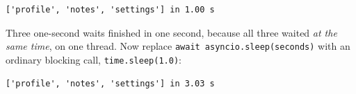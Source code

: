 \begin{codebox}[short]

\begin{Shaded}
\begin{Highlighting}[]


 \NormalTok{) }\OperatorTok{{-}\textgreater{}} \NormalTok{:}


 \OperatorTok{{-}\textgreater{}} \NormalTok{:}
\OperatorTok{=}
\OperatorTok{=} 
\NormalTok{, }\NormalTok{, }\NormalTok{, }\NormalTok{)}
\NormalTok{    )}
    \SpecialCharTok{\{}\OperatorTok{{-}}\NormalTok{)}


\end{Highlighting}
\end{Shaded}

\end{codebox}

\begin{outputbox}[short]
\begin{Verbatim}[fontsize=\codesize, breaklines, breakanywhere, breaksymbolleft={\tiny\textcolor{muted}{$\hookrightarrow$}}]
['profile', 'notes', 'settings'] in 1.00 s
\end{Verbatim}
\end{outputbox}

\noindent{}Three one-second waits finished in one second, because all three waited \emph{at the same time}, on one thread. Now replace \texttt{await\ asyncio.}\allowbreak{}\texttt{sleep(seconds)} with an ordinary blocking call, \texttt{time.sleep(1.0)}:

\begin{outputbox}[short]
\begin{Verbatim}[fontsize=\codesize, breaklines, breakanywhere, breaksymbolleft={\tiny\textcolor{muted}{$\hookrightarrow$}}]
['profile', 'notes', 'settings'] in 3.03 s
\end{Verbatim}
\end{outputbox}

